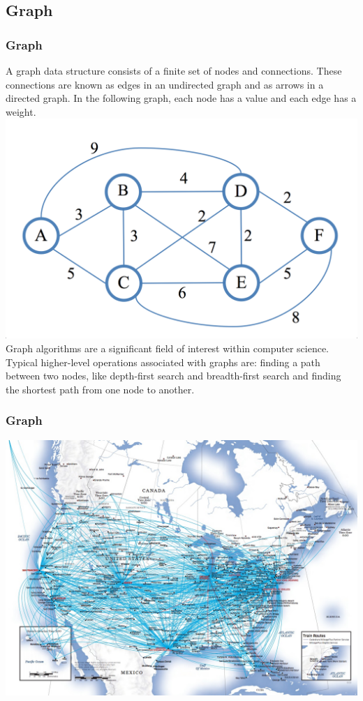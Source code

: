 \subsection{Graph}
\begin{frame}[fragile]
\frametitle{Graph}
{\small
A graph data structure consists of a finite set of nodes and connections.
These connections are known as edges in an undirected graph and as arrows in a directed graph.
In the following graph, each node has a value and each edge has a weight.\\
\vspace{3mm}
\includegraphics[scale=0.08]{img/graph.png}\\
\vspace{3mm}
Graph algorithms are a significant field of interest within computer science. Typical higher-level operations associated with graphs are:
finding a path between two nodes, like depth-first search and breadth-first search and finding the shortest path from one node to another.
}
\end{frame}

\begin{frame}[fragile]
\frametitle{Graph}
\includegraphics[scale=0.22]{img/flight.jpg}
\end{frame}

